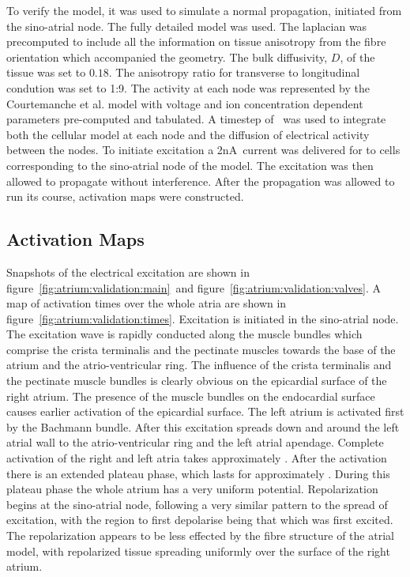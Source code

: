 To verify the model, it was used to simulate a normal propagation, initiated
from the sino-atrial node.
The fully detailed model was used.
The laplacian was precomputed to include all the information on tissue
anisotropy from the fibre orientation which accompanied the geometry.
The bulk diffusivity, $D$, of the tissue was set to $0.18$.
The anisotropy ratio for transverse to longitudinal condution was set to 1:9.
The activity at each node was represented by the Courtemanche et al. model with
voltage and ion concentration dependent parameters pre-computed and tabulated.
A timestep of \ was used to integrate both the cellular model at each
node and the diffusion of electrical activity between the nodes.
To initiate excitation a \unit{2}{nA}\ current was delivered for  to cells
corresponding to the sino-atrial node of the model.
The excitation was then allowed to propagate without interference.
After the propagation was allowed to run its course, activation maps were
constructed.

\subsection{Activation Maps}

Snapshots of the electrical excitation are shown in
figure~\ref{fig:atrium:validation:main}\ and figure~\ref{fig:atrium:validation:valves}.
A map of activation times over the whole atria are shown in
figure~\ref{fig:atrium:validation:times}.
Excitation is initiated in the sino-atrial node.
The excitation wave is rapidly conducted along the muscle bundles which comprise
the crista terminalis and the pectinate muscles towards the base of the atrium
and the atrio-ventricular ring.
The influence of the crista terminalis and the pectinate muscle bundles is
clearly obvious on the epicardial surface of the right atrium.
The presence of the muscle bundles on the endocardial surface causes earlier
activation of the epicardial surface.
The left atrium is activated first by the Bachmann bundle.
After this excitation spreads down and around the left atrial wall to the
atrio-ventricular ring and the left atrial apendage.
Complete activation of the right and left atria takes approximately .
After the activation there is an extended plateau phase, which lasts for
approximately .
During this plateau phase the whole atrium has a very uniform potential.
Repolarization begins at the sino-atrial node, following a very similar pattern
to the spread of excitation, with the region to first depolarise being that
which was first excited.
The repolarization appears to be less effected by the fibre structure of the
atrial model, with repolarized tissue spreading uniformly over the surface of
the right atrium.


